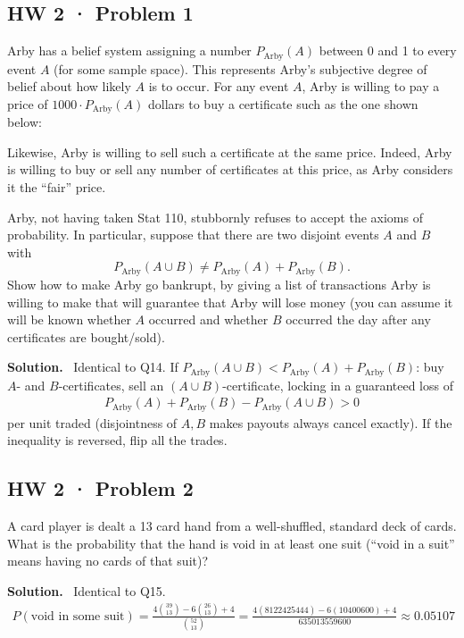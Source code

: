 \documentclass[11pt]{article}
\newcommand{\Sol}{\vspace{2pt}\noindent\textbf{Solution.}\ }
\begin{document}
\newpage
\subsection{HW 2 · Problem 1}
\begin{qbox}
Arby has a belief system assigning a number $P_{\text{Arby}}(A)$ between 0 and 1 to every event $A$ (for some sample space). This represents Arby's subjective degree of belief about how likely $A$ is to occur. For any event $A$, Arby is willing to pay a price of $1000\cdot P_{\text{Arby}}(A)$ dollars to buy a certificate such as the one shown below:

\medskip
{}
\medskip

Likewise, Arby is willing to sell such a certificate at the same price. Indeed, Arby is willing to buy or sell any number of certificates at this price, as Arby considers it the ``fair'' price.

Arby, not having taken Stat 110, stubbornly refuses to accept the axioms of probability. In particular, suppose that there are two disjoint events $A$ and $B$ with
\[
P_{\text{Arby}}(A\cup B) \ne P_{\text{Arby}}(A) + P_{\text{Arby}}(B).
\]
Show how to make Arby go bankrupt, by giving a list of transactions Arby is willing to make that will guarantee that Arby will lose money (you can assume it will be known whether $A$ occurred and whether $B$ occurred the day after any certificates are bought/sold).
\end{qbox}
\Sol
Identical to Q14. If $P_{\text{Arby}}(A\cup B) < P_{\text{Arby}}(A)+P_{\text{Arby}}(B)$: buy $A$- and $B$-certificates, sell an $(A\cup B)$-certificate, locking in a guaranteed loss of
\begin{align*}
P_{\text{Arby}}(A)+P_{\text{Arby}}(B) - P_{\text{Arby}}(A\cup B) > 0
\end{align*}
per unit traded (disjointness of $A,B$ makes payouts always cancel exactly). If the inequality is reversed, flip all the trades.

\subsection{HW 2 · Problem 2}
\begin{qbox}
A card player is dealt a 13 card hand from a well-shuffled, standard deck of cards. What is the probability that the hand is void in at least one suit (``void in a suit'' means having no cards of that suit)?
\end{qbox}
\Sol
Identical to Q15.
\begin{align*}
P(\text{void in some suit}) = \frac{4\binom{39}{13}-6\binom{26}{13}+4}{\binom{52}{13}} = \frac{4(8122425444)-6(10400600)+4}{635013559600} \approx 0.05107
\end{align*}
\end{document}
